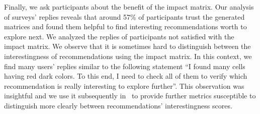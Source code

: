Finally, we ask participants about the benefit of the impact matrix. Our analysis of surveys' replies reveals that around 57\% of participants trust the generated matrices and found them helpful to find interesting recommendations worth to explore next. We analyzed the replies of participants not satisfied with the impact matrix. We observe that it is sometimes hard to distinguish between the interestingness of recommendations using the impact matrix. In this context, we find many users' replies similar to the following statement ``I found many cells having red dark colors. To this end, I need to check all of them to verify which recommendation is really interesting to explore further''.
This observation was insightful and we use it subsequently in~\cite{Houssem:19:adbis,Houssem:19:IS} to provide further metrics susceptible to distinguish more clearly between recommendations' interestingness scores. 





